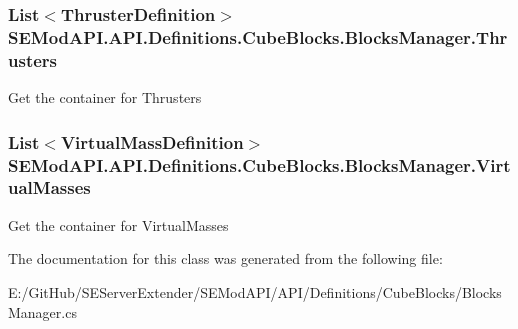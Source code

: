 \subsubsection[{Thrusters}]{\setlength{\rightskip}{0pt plus 5cm}List$<${\bf Thruster\+Definition}$>$ S\+E\+Mod\+A\+P\+I.\+A\+P\+I.\+Definitions.\+Cube\+Blocks.\+Blocks\+Manager.\+Thrusters\hspace{0.3cm}{\ttfamily [get]}}\label{class_s_e_mod_a_p_i_1_1_a_p_i_1_1_definitions_1_1_cube_blocks_1_1_blocks_manager_aa51992a83d36cdc904d7c07e329e8987}


Get the container for Thrusters 

\hypertarget{class_s_e_mod_a_p_i_1_1_a_p_i_1_1_definitions_1_1_cube_blocks_1_1_blocks_manager_a2a38a0066ec2370e7ea91888f0ca9b34}{}
\subsubsection[{Virtual\+Masses}]{\setlength{\rightskip}{0pt plus 5cm}List$<${\bf Virtual\+Mass\+Definition}$>$ S\+E\+Mod\+A\+P\+I.\+A\+P\+I.\+Definitions.\+Cube\+Blocks.\+Blocks\+Manager.\+Virtual\+Masses\hspace{0.3cm}{\ttfamily [get]}}\label{class_s_e_mod_a_p_i_1_1_a_p_i_1_1_definitions_1_1_cube_blocks_1_1_blocks_manager_a2a38a0066ec2370e7ea91888f0ca9b34}


Get the container for Virtual\+Masses 



The documentation for this class was generated from the following file\+:\begin{DoxyCompactItemize}
\item 
E\+:/\+Git\+Hub/\+S\+E\+Server\+Extender/\+S\+E\+Mod\+A\+P\+I/\+A\+P\+I/\+Definitions/\+Cube\+Blocks/Blocks\+Manager.\+cs\end{DoxyCompactItemize}
